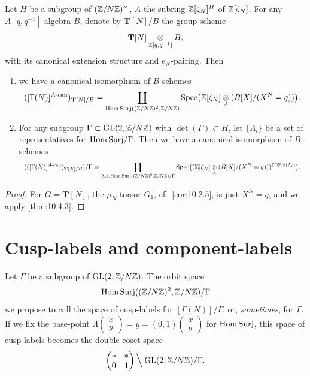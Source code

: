 \begin{kthm}\label{thm:10.5.1}
Let $H$ be a subgroup of $(\mathbb{Z}/N\mathbb{Z})^\times$, $A$ the subring $\mathbb{Z}[\zeta_N]^H$ of $\mathbb{Z}[\zeta_N]$. For any $A[q,q^{-1}]$-algebra $B$, denote by $\mathbf{T}[N]/B$ the group-scheme
\[
\mathbf{T}[N] \underset{\mathbb{Z}[q,q^{-1}]}{\otimes} B ,
\]
with its canonical extension structure and $e_N$-pairing. Then
\begin{enumerate}[label=(\arabic*)]
\item we have a canonical isomorphism of $B$-schemes
\[
\resizebox{0.96\linewidth}{!}{$\displaystyle
([\Gamma(N)]^{A\text{-can}})_{\mathbf{T}[N]/B} = \coprod_{\HomSurj((\Z/N\Z)^2, \Z/N\Z)} \Spec\bigl(\Z[\zeta_N] \tens{A} (B[X]/(X^N = q))\bigr) .
$}
\]
\item For any subgroup $\Gamma \subset \operatorname{GL}(2,\mathbb{Z}/N\mathbb{Z})$ with $\det(\Gamma) \subset H$, let $\{\Lambda_i\}$ be a set of representatives for $\mathrm{Hom\,Surj}/\Gamma$. Then we have a canonical isomorphism of $B$-schemes
\[
\resizebox{0.96\linewidth}{!}{$\displaystyle
(([\Gamma(N)]^{A\text{-can}})_{\mathbf{T}[N]/B})/\Gamma = \coprod_{\Lambda_i \in \HomSurj((\Z/N\Z)^2, \Z/N\Z)/\Gamma} \Spec\bigl((\Z[\zeta_N] \tens{A} (B[X]/(X^N = q)))^{\Gamma \cap \Fix(\Lambda_i)}\bigr) .
$}
\]
\end{enumerate}
\end{kthm}

\begin{proof}
For $G = \mathbf{T}[N]$, the $\mu_N$-torsor $G_1$, cf.~\eqref{cor:10.2.5}, is just $X^N = q$, and we apply \eqref{thm:10.4.3}.
\end{proof}


\section{Cusp-labels and component-labels}
\label{sec:10.6}

Let $\Gamma$ be a subgroup of $\operatorname{GL}(2,\mathbb{Z}/N\mathbb{Z})$. The orbit space
\[
\mathrm{Hom\,Surj}((\mathbb{Z}/N\mathbb{Z})^2, \mathbb{Z}/N\mathbb{Z})/\Gamma
\]
we propose to call the space of cusp-labels for $[\Gamma(N)]/\Gamma$, or, \emph{sometimes}, for $\Gamma$. If we fix the base-point $\Lambda\begin{pmatrix} x \\ y \end{pmatrix} = y = (0,1)\begin{pmatrix} x \\ y \end{pmatrix}$ for $\mathrm{Hom\,Surj}$, this space of cusp-labels becomes the double coset space
\[
\begin{pmatrix} * & * \\ 0 & 1 \end{pmatrix} \Big\backslash \operatorname{GL}(2,\mathbb{Z}/N\mathbb{Z})/\Gamma .
\]

